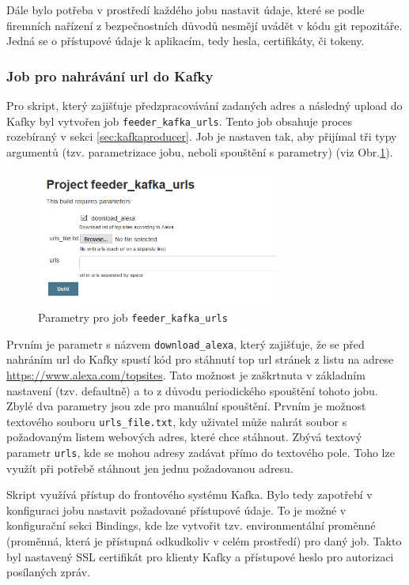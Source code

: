 \documentclass[thesis=M,czech,hidelinks]{FITthesis}[2013/05/06]
\begin{document}
Dále bylo potřeba v prostředí každého jobu nastavit údaje, které se podle firemních nařízení z bezpečnostních důvodů nesmějí uvádět v kódu git repozitáře. Jedná se o přístupové údaje k aplikacím, tedy hesla, certifikáty, či tokeny.


\subsubsection{Job pro nahrávání url do Kafky}
Pro skript, který zajišťuje předzpracovávání zadaných adres a následný upload do Kafky byl vytvořen job \texttt{feeder_kafka_urls}. Tento job obsahuje proces rozebíraný v sekci \ref{sec:kafkaproducer}. Job je nastaven tak, aby přijímal tři typy argumentů (tzv. parametrizace jobu, neboli spouštění s parametry) (viz Obr.\ref{fig:kafka_feed}). 

\begin{figure}[h]
	\centering
	\includegraphics[width=8cm]{pictures/jenkins_kafka_feed.png}
	\caption{Parametry pro job \texttt{feeder_kafka_urls}}
	\label{fig:kafka_feed}
\end{figure}

Prvním je parametr s názvem \texttt{download_alexa}, který zajišťuje, že se před nahráním url do Kafky spustí kód pro stáhnutí top url stránek z listu na adrese \url{https://www.alexa.com/topsites}. Tato možnost je zaškrtnuta v základním nastavení (tzv. defaultně) a to z důvodu periodického spouštění tohoto jobu. Zbylé dva parametry jsou zde pro manuální spouštění. Prvním je možnost textového souboru \texttt{urls_file.txt}, kdy uživatel může nahrát soubor s požadovaným listem webových adres, které chce stáhnout. Zbývá textový parametr \texttt{urls}, kde se mohou adresy zadávat přímo do textového pole. Toho lze využít při potřebě stáhnout jen jednu požadovanou adresu. 

Skript využívá přístup do frontového systému Kafka. Bylo tedy zapotřebí v konfiguraci jobu nastavit požadované přístupové údaje. To je možné v konfigurační sekci Bindings, kde lze vytvořit tzv. environmentální proměnné (proměnná, která je přístupná odkudkoliv v celém prostředí) pro daný job. Takto byl nastavený SSL certifikát pro klienty Kafky a přístupové heslo pro autorizaci posílaných zpráv.
\end{document}
